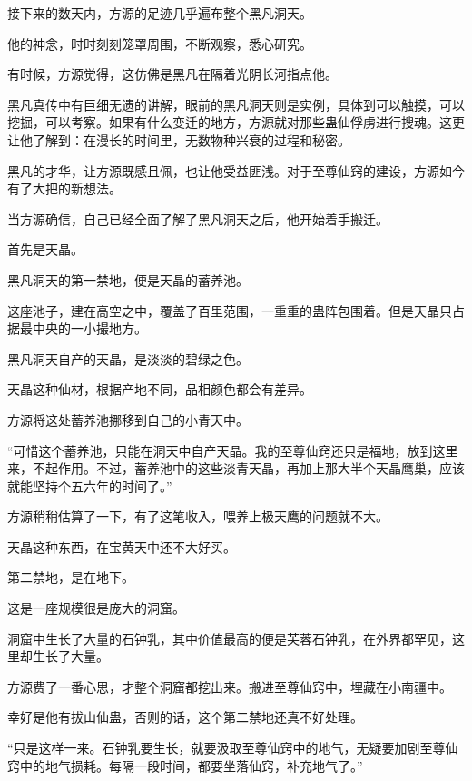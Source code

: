 
\begin{this_body}



接下来的数天内，方源的足迹几乎遍布整个黑凡洞天。

他的神念，时时刻刻笼罩周围，不断观察，悉心研究。

有时候，方源觉得，这仿佛是黑凡在隔着光阴长河指点他。

黑凡真传中有巨细无遗的讲解，眼前的黑凡洞天则是实例，具体到可以触摸，可以挖掘，可以考察。如果有什么变迁的地方，方源就对那些蛊仙俘虏进行搜魂。这更让他了解到：在漫长的时间里，无数物种兴衰的过程和秘密。

黑凡的才华，让方源既感且佩，也让他受益匪浅。对于至尊仙窍的建设，方源如今有了大把的新想法。

当方源确信，自己已经全面了解了黑凡洞天之后，他开始着手搬迁。

首先是天晶。

黑凡洞天的第一禁地，便是天晶的蓄养池。

这座池子，建在高空之中，覆盖了百里范围，一重重的蛊阵包围着。但是天晶只占据最中央的一小撮地方。

黑凡洞天自产的天晶，是淡淡的碧绿之色。

天晶这种仙材，根据产地不同，品相颜色都会有差异。

方源将这处蓄养池挪移到自己的小青天中。

“可惜这个蓄养池，只能在洞天中自产天晶。我的至尊仙窍还只是福地，放到这里来，不起作用。不过，蓄养池中的这些淡青天晶，再加上那大半个天晶鹰巢，应该就能坚持个五六年的时间了。”

方源稍稍估算了一下，有了这笔收入，喂养上极天鹰的问题就不大。

天晶这种东西，在宝黄天中还不大好买。

第二禁地，是在地下。

这是一座规模很是庞大的洞窟。

洞窟中生长了大量的石钟乳，其中价值最高的便是芙蓉石钟乳，在外界都罕见，这里却生长了大量。

方源费了一番心思，才整个洞窟都挖出来。搬进至尊仙窍中，埋藏在小南疆中。

幸好是他有拔山仙蛊，否则的话，这个第二禁地还真不好处理。

“只是这样一来。石钟乳要生长，就要汲取至尊仙窍中的地气，无疑要加剧至尊仙窍中的地气损耗。每隔一段时间，都要坐落仙窍，补充地气了。”


\end{this_body}
